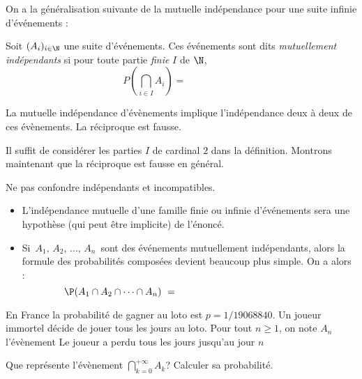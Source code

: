 \documentclass[a4paper,10pt]{report}
\begin{document}
\begin{enumerate}
\begin{itemize}
 
On a la généralisation suivante de la mutuelle indépendance pour une suite infinie d'événements :

\begin{Definition}{}
 Soit $(A_i)_{i \in \N}$ une suite d'événements. Ces événements sont dits \emph{mutuellement indépendants} si  pour toute partie \emph{finie} $I$ de $\N$,
$$ P\left(\bigcap_{i \in I} A_i \right) = \phantom{\prod_{i\in I} P(A_i).}$$
\end{Definition}

\begin{Proposition}{} La mutuelle indépendance d'évènements implique l'indépendance deux à deux de ces évènements. La réciproque est fausse.
\end{Proposition}

\begin{Demonstration}{} Il suffit de considérer les parties $I$ de cardinal $2$ dans la définition. Montrons maintenant que la réciproque est fausse en général. 

\vspace{5cm}
\end{Demonstration}

\begin{att}
 Ne pas confondre indépendants et incompatibles.
\end{att}

\medskip

\begin{Remarques}{}
\begin{itemize}
 \item L'indépendance mutuelle d'une famille finie ou infinie d'événements sera une hypothèse (qui peut être implicite) de l'énoncé.
 \item Si $\,A_1,\,A_2,\,\dots,\,A_n\,$ sont des événements mutuellement indépendants, 
alors la formule des probabilités composées devient beaucoup plus simple. On a alors : 
$$ \P(A_1\cap A_2\cap \cdots\cap A_{n})\ = \phantom{ \P(A_1)\times \P(A_2)\times\cdots\times \P(A_{n})}$$
\end{itemize}
\end{Remarques}{}


\begin{Exemple} En France la probabilité de gagner au loto est $p=1/19 068 840$. Un joueur immortel décide de jouer tous les jours au loto. Pour tout $n \geq 1$, on note $A_n$ l'évènement \og Le joueur a perdu tous les jours jusqu'au jour $n$ \fg 

Que représente l'évènement $\bigcap_{k=0}^{+\infty\ }A_k$? Calculer sa probabilité.


\end{Exemple}
\end{itemize}
\end{enumerate}
\end{document}
